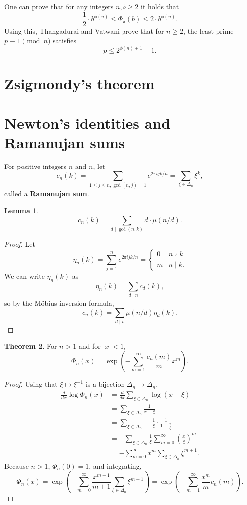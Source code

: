 \documentclass{article}
\theoremstyle{definition}
\newtheorem{theorem}{Theorem}
\newtheorem{lemma}[theorem]{Lemma}
\theoremstyle{definition}
\begin{document}
One can prove that for any integers $n,b \geq 2$ it holds that
\[
\frac{1}{2} \cdot b^{\phi(n)} \leq \Phi_n(b) \leq 2\cdot b^{\phi(n)}.
\]
Using this, Thangadurai and Vatwani \cite{thangadurai} prove that
for $n \geq 2$, the least prime $p \equiv 1 \pmod{n}$ satisfies
\[
p \leq 2^{\phi(n)+1}-1.
\]



\section{Zsigmondy's theorem}

\cite[pp.~167--169, \S 8.3.1]{everest}


\section{Newton's identities and Ramanujan sums}
For positive integers $n$ and $n$,
let
\[
c_n(k) = \sum_{1 \leq j \leq n, \gcd(n,j)=1} e^{2\pi ijk/n} = \sum_{\xi \in \Delta_n} \xi^k,
\]
called a \textbf{Ramanujan sum}.


\begin{lemma}
\[
c_n(k) = \sum_{d \mid \gcd(n,k)} d\cdot \mu(n/d).
\]
\label{ramanujanmobius}
\end{lemma}
\begin{proof}
Let
\[
\eta_n(k) = \sum_{j=1}^n e^{2\pi ijk/n} 
=\begin{cases}
0&n \nmid k\\
m&n \mid k.
\end{cases}
\]
We can write $\eta_n(k)$ as
\[
\eta_n(k) = \sum_{d \mid n} c_d(k),
\]
so by the M\"obius inversion formula, 
\[
c_n(k) = \sum_{d \mid n} \mu(n/d) \eta_d(k).
\]
\end{proof}



\begin{theorem}
For $n>1$ and for $|x|<1$,
\[
\Phi_n(x) = \exp\left(
-\sum_{m=1}^\infty \frac{c_n(m)}{m} x^m\right).
\]
\label{ramanujanexp}
\end{theorem}
\begin{proof}
Using that $\xi \mapsto \xi^{-1}$ is a bijection $\Delta_n \to \Delta_n$,
\begin{align*}
 \frac{d}{dx} \log \Phi_n(x)&=\frac{d}{dx} \sum_{\xi \in \Delta_n} \log (x-\xi)\\
&=\sum_{\xi \in \Delta_n} \frac{1}{x-\xi}\\
&=\sum_{\xi \in \Delta_n} -\frac{1}{\xi} \cdot \frac{1}{1-\frac{x}{\xi}}\\
&=- \sum_{\xi \in \Delta_n} \frac{1}{\xi} \sum_{m=0}^\infty \left(\frac{x}{\xi}\right)^m\\
&=-\sum_{m=0}^\infty x^m \sum_{\xi \in \Delta_n} \xi^{m+1}.
\end{align*}
Because $n>1$, $\Phi_n(0)=1$, and integrating,
\[
\Phi_n(x) = \exp\left( -\sum_{m=0}^\infty \frac{x^{m+1}}{m+1} \sum_{\xi \in \Delta_n} \xi^{m+1}\right)
=\exp\left(-\sum_{m=1}^\infty \frac{x^m}{m} c_n(m)\right).
\]
\end{proof}
\end{document}
